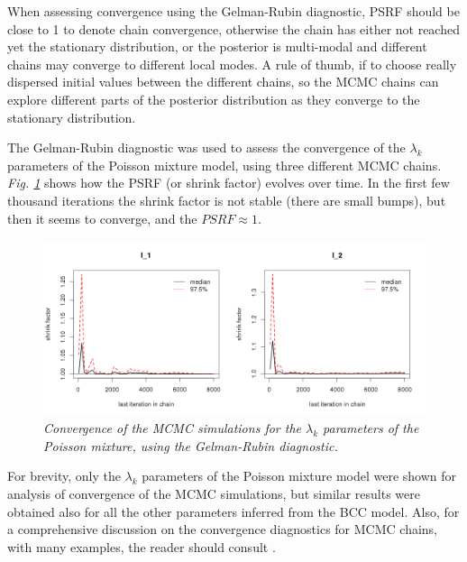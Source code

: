 When assessing convergence using the Gelman-Rubin diagnostic, PSRF should be close to 1 to denote chain convergence, otherwise the chain has either not reached yet the stationary distribution, or the posterior is multi-modal and different chains may converge to different local modes. A rule of thumb, if to choose really dispersed initial values between the different chains, so the MCMC chains can explore different parts of the posterior distribution as they converge to the stationary distribution.

The Gelman-Rubin diagnostic was used to assess the convergence of the $\lambda_{k}$ parameters of the Poisson mixture model, using three different MCMC chains. \emph{Fig. \ref{psrf-lambda-pic}} shows how the PSRF (or shrink factor) evolves over time. In the first few thousand iterations the shrink factor is not stable (\ie there are small bumps), but then it seems to converge, and the $PSRF \approx 1$.  
\begin{figure}[!ht]
\begin{center}
 \includegraphics[scale = 0.41]{images/psrf-l.png}
\caption{\emph{Convergence of the MCMC simulations for the $\lambda_{k}$ parameters of the Poisson mixture, using the Gelman-Rubin diagnostic.}}
\label{psrf-lambda-pic}
\end{center}
\end{figure}

For brevity, only the $\lambda_{k}$ parameters of the Poisson mixture model were shown for analysis of convergence of the MCMC simulations, but similar results were obtained also for all the other parameters inferred from the BCC model. Also, for a comprehensive discussion on the convergence diagnostics for MCMC chains, with many examples, the reader should consult \citep{Brooks1999, Robert2009}.